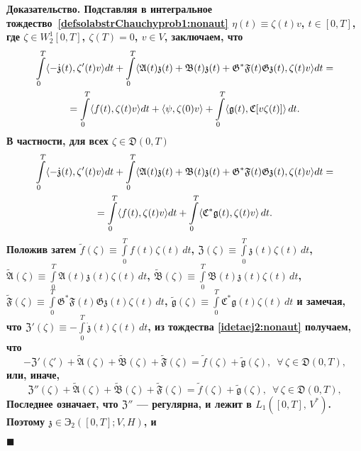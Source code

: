 \documentclass{report}
\newenvironment{Proof}{\par\noindent\bf Доказательство.\rm}{ $\blacksquare$\par}
\begin{document}
\begin{Proof}
Подставляя в интегральное тождество~\eqref{defsolabstrChauchyprob1:nonaut} $\eta(t)\equiv\zeta(t)v$, $t\in[0,T]$, где $\zeta\in W^1_2[0,T]$, $\zeta(T)=0$, $v\in V$, заключаем, что
\begin{gather}\label{idetaej1:nonaut}
\int\limits_0^T\langle-\dot{\mathfrak{z}}(t),\zeta'(t)v\rangle dt+\int\limits_0^T\langle\mathfrak{A}(t){\mathfrak{z}}(t)+\mathfrak{B}(t){\mathfrak{z}}(t) + \mathfrak{G}^*\mathfrak{F}(t)\mathfrak{G}{\mathfrak{z}}(t), \zeta(t)v\rangle dt=\\
\notag=\int\limits_0^T\langle f(t), \zeta(t)v\rangle dt+\langle\psi,\zeta(0)v\rangle+\int\limits_0^T\langle{\mathfrak{g}}(t), \mathfrak{C}[v\zeta(t)]\rangle\,dt.
\end{gather}
В частности, для всех $\zeta\in\mathfrak{D}(0,T)$
\begin{gather}\label{idetaej2:nonaut}
\int\limits_0^T\langle-\dot{\mathfrak{z}}(t),\zeta'(t)v\rangle dt+\int\limits_0^T\langle\mathfrak{A}(t){\mathfrak{z}}(t)+\mathfrak{B}(t){\mathfrak{z}}(t) +\mathfrak{G}^*\mathfrak{F}(t)\mathfrak{G}{\mathfrak{z}}(t), \zeta(t)v\rangle dt=\\
\notag=\int\limits_0^T\langle f(t), \zeta(t)v\rangle dt+\int\limits_0^T\langle\mathfrak{C}^*{\mathfrak{g}}(t), \zeta(t)v\rangle\,dt.
\end{gather}
Положив затем $\tilde{f}(\zeta)\equiv\int\limits_{0}^{T}f(t)\zeta(t)\,dt$, ${\mathfrak{Z}}(\zeta)\equiv\int\limits_{0}^{T}{\mathfrak{z}}(t)\zeta(t)\,dt$,
$\tilde{\mathfrak{A}}(\zeta)\equiv\int\limits_{0}^{T}\mathfrak{A}(t){\mathfrak{z}}(t)\zeta(t)\,dt$,
$\tilde{\mathfrak{B}}(\zeta)\equiv\int\limits_{0}^{T}\mathfrak{B}(t){\mathfrak{z}}(t)\zeta(t)\,dt$, 
$\tilde{\mathfrak{F}}(\zeta)\equiv\int\limits_{0}^{T}\mathfrak{G}^*\mathfrak{F}(t)\mathfrak{G}{\mathfrak{z}}(t)\zeta(t)\,dt$, 
$\tilde{\mathfrak{g}}(\zeta)\equiv\int\limits_{0}^{T}\mathfrak{C}^*{\mathfrak{g}}(t)\zeta(t)\,dt$ и
замечая, что ${\mathfrak{Z}}'(\zeta)\equiv-\int\limits_{0}^{T}\dot{\mathfrak{z}}(t)\zeta(t)\,dt$, из тождества \eqref{idetaej2:nonaut} получаем, что
$$
-{\mathfrak{Z}}'(\zeta')+\tilde{\mathfrak{A}}(\zeta)+\tilde{\mathfrak{B}}(\zeta)+\tilde{\mathfrak{F}}(\zeta)=\tilde{f}(\zeta)+\tilde{\mathfrak{g}}(\zeta),\,\,\, \forall\,\zeta\in {\mathfrak{D}}(0,T),
$$
или, иначе,
$$
{\mathfrak{Z}}''(\zeta)+\tilde{\mathfrak{A}}(\zeta)+\tilde{\mathfrak{B}}(\zeta)+\tilde{\mathfrak{F}}(\zeta)=\tilde{f}(\zeta)+\tilde{\mathfrak{g}}(\zeta),\,\,\, \forall\,\zeta\in {\mathfrak{D}}(0,T),
$$
Последнее означает, что ${\mathfrak{Z}}''$ --- регулярна, и лежит в $L_1([0,T],\,V^*)$. Поэтому ${\mathfrak{z}}\in{\textrm{Э}}_2([0,T];V,H)$, и

\end{Proof}
\end{document}
